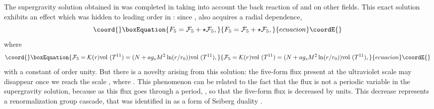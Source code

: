 \documentclass[12pt,epsf,a4paper]{article}
\begin{document}
The supergravity solution obtained in \cite{KN} was completed in \cite{KT} taking into 
account the back reaction of \coordHE{} and \coordHE{} on other fields. This exact solution 
exhibits an effect which was hidden to leading order in \coordHE{}: since 
\coordHE{}, \coordHE{} also acquires a radial dependence,
\begin{equation}\coord{}\boxEquation{
F_5 = {\cal F}_5 + \star {\cal F}_5,
\label{5}
}{
F_5 = {\cal F}_5 + \star {\cal F}_5,
}{ecuacion}\coordE{}\end{equation}
where 
\begin{equation}\coord{}\boxEquation{
{\cal F}_5 = {\cal K}(r)  \hbox{vol }(T^{11}) = 
(N + a g_s M^2 \ln (r/r_0)) \hbox{vol }(T^{11}),
\label{6}
}{
{\cal F}_5 = {\cal K}(r)  \hbox{vol }(T^{11}) = 
(N + a g_s M^2 \ln (r/r_0)) \hbox{vol }(T^{11}),
}{ecuacion}\coordE{}\end{equation}
with \coordHE{} a constant of order unity. But there is a novelty arising from this 
solution: the five-form flux present at the  
ultraviolet scale \coordHE{} may disappear once we reach the scale \coordHE{}, where 
\coordHE{}. This phenomenon can be related to the fact that the flux 
\coordHE{} is not a periodic variable in the supergravity solution, because as 
this flux goes through a period, \coordHE{}, so that 
the five-form flux is decreased by \coordHE{} units. This decrease represents a renormalization 
group cascade, that was identified in \cite{KS} as a form of Seiberg duality \cite{Seiberg}.
  
\end{document}

